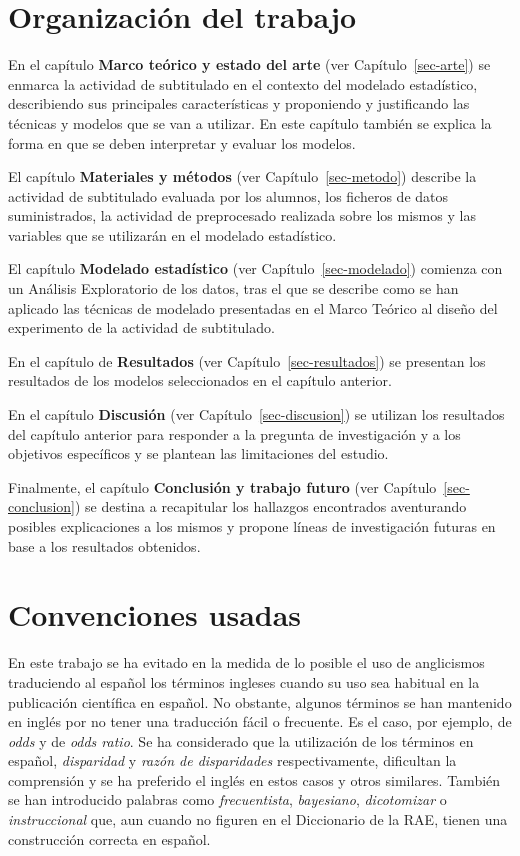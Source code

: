 \documentclass[
  12pt,
  a4paper,
  extrafontsizes,
  onecolumn,
  openright,
  table]{memoir}
\begin{document}
\hypertarget{organizaciuxf3n-del-trabajo}{%
\section{Organización del trabajo}\label{organizaciuxf3n-del-trabajo}}

En el capítulo \textbf{Marco teórico y estado del arte} (ver
Capítulo~\ref{sec-arte}) se enmarca la actividad de subtitulado en el
contexto del modelado estadístico, describiendo sus principales
características y proponiendo y justificando las técnicas y modelos que
se van a utilizar. En este capítulo también se explica la forma en que
se deben interpretar y evaluar los modelos.

El capítulo \textbf{Materiales y métodos} (ver
Capítulo~\ref{sec-metodo}) describe la actividad de subtitulado evaluada
por los alumnos, los ficheros de datos suministrados, la actividad de
preprocesado realizada sobre los mismos y las variables que se
utilizarán en el modelado estadístico.

El capítulo \textbf{Modelado estadístico} (ver
Capítulo~\ref{sec-modelado}) comienza con un Análisis Exploratorio de
los datos, tras el que se describe como se han aplicado las técnicas de
modelado presentadas en el Marco Teórico al diseño del experimento de la
actividad de subtitulado.

En el capítulo de \textbf{Resultados} (ver
Capítulo~\ref{sec-resultados}) se presentan los resultados de los
modelos seleccionados en el capítulo anterior.

En el capítulo \textbf{Discusión} (ver Capítulo~\ref{sec-discusion}) se
utilizan los resultados del capítulo anterior para responder a la
pregunta de investigación y a los objetivos específicos y se plantean
las limitaciones del estudio.

Finalmente, el capítulo \textbf{Conclusión y trabajo futuro} (ver
Capítulo~\ref{sec-conclusion}) se destina a recapitular los hallazgos
encontrados aventurando posibles explicaciones a los mismos y propone
líneas de investigación futuras en base a los resultados obtenidos.

\hypertarget{convenciones-usadas}{%
\section{Convenciones usadas}\label{convenciones-usadas}}

En este trabajo se ha evitado en la medida de lo posible el uso de
anglicismos traduciendo al español los términos ingleses cuando su uso
sea habitual en la publicación científica en español. No obstante,
algunos términos se han mantenido en inglés por no tener una traducción
fácil o frecuente. Es el caso, por ejemplo, de \emph{odds} y de
\emph{odds ratio}. Se ha considerado que la utilización de los términos
en español, \emph{disparidad} y \emph{razón de disparidades}
respectivamente, dificultan la comprensión y se ha preferido el inglés
en estos casos y otros similares. También se han introducido palabras
como \emph{frecuentista}, \emph{bayesiano}, \emph{dicotomizar} o
\emph{instruccional} que, aun cuando no figuren en el Diccionario de la
RAE, tienen una construcción correcta en español.
\end{document}
